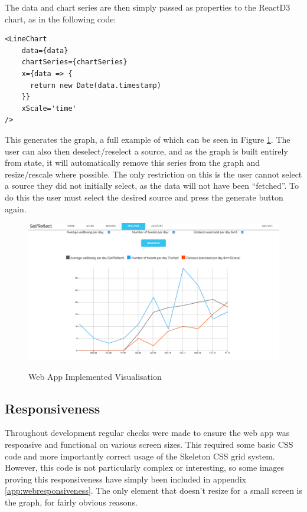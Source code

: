 \documentclass[11pt,openright,a4paper]{report}
\begin{document}
The data and chart series are then simply passed as properties to the ReactD3 chart, as in the following code:
\begin{lstlisting}
<LineChart
    data={data}
    chartSeries={chartSeries}
    x={data => {
      return new Date(data.timestamp)
    }}
    xScale='time'
/>
\end{lstlisting}

This generates the graph, a full example of which can be seen in Figure \ref{fig:webanalysisgraph}. The user can also then deselect/reselect a source, and as the graph is built entirely from state, it will automatically remove this series from the graph and resize/rescale where possible. The only restriction on this is the user cannot select a source they did not initially select, as the data will not have been \enquote{fetched}. To do this the user must select the desired source and press the generate button again.

\begin{figure}[ht]
\centering
\caption{Web App Implemented Visualisation}
\includegraphics[width=\textwidth]{i/webanalysisgraph.png}
\label{fig:webanalysisgraph}
\end{figure}

\subsection{Responsiveness}
Throughout development regular checks were made to ensure the web app was responsive and functional on various screen sizes. This required some basic CSS code and more importantly correct usage of the Skeleton CSS grid system. However, this code is not particularly complex or interesting, so some images proving this responsiveness have simply been included in appendix \ref{app:webresponsiveness}. The only element that doesn't resize for a small screen is the graph, for fairly obvious reasons.
\end{document}
